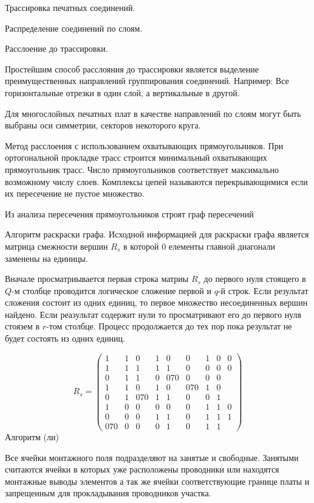 \documentclass{article}
\begin{document}
	Трассировка печатных соединений.

	Распределение соединений по слоям.

	Расслоение до трассировки.
	
	Простейшим способ расслояния до трассировки является выделение преимущественных направлений группирования соединений.
	Например: Все горизонтальные отрезки в один слой, а вертикальные в другой.

	Для многослойных печатных плат в качестве направлений по слоям могут быть выбраны оси симметрии, секторов некоторого круга.
	
	Метод расслоения с использованием охватывающих прямоугольников. При ортогональной прокладке трасс строится минимальный охватывающих прямоугольник трасс. Число прямоугольников соответствует максимально возможному числу слоев. Комплексы цепей называются перекрывающимися если их пересечение не пустое множество.

	Из анализа пересечения прямоугольников строят граф пересечений

	Алгоритм раскраски графа.
	Исходной информацией для раскраски графа является матрица смежности вершин $R_s$ в которой 0 елементы главной диагонали заменены на единицы.

	Вначале просматриывается первая строка матриы $R_s$ до первого нуля стоящего в $Q$-м столбце проводится логическое сложение первой и $q$-й строк. Если результат сложения состоит из одних единиц, то первое множество несоединенных вершин найдено. Если реазультат содержит нули то просматривают его до первого нуля стоязем в $r$-том столбце. Процесс продолжается до тех пор пока результат не будет состоять из одних единиц.

	$$
	R_s = 
	\begin{pmatrix}
		1 & 1 & 0 & 1 & 0 & 0 & 1 & 0 & 0\\
		1 & 1 & 1 & 1 & 1 & 0 & 0 & 0 & 0\\
		0 & 1 & 1 & 0 & 0 7 0 & 0 & 0 & 0\\
		1 & 1 & 0 & 1 & 0 & 0 7 0 & 1 & 0\\
		0 & 1 & 0 7 0 & 1 & 1 & 0 & 0 & 1\\
		1 & 0 & 0 & 0 & 0 & 0 & 1 & 1 & 0\\
		0 & 0 & 0 & 1 & 1 & 0 & 1 & 1 & 1\\
		0 7 0 & 0 & 0 & 0 & 1 & 0 & 1 & 1
	\end{pmatrix}
	$$
Алгоритм (ли)

Все ячейки монтажного поля подразделяют на занятые и свободные. Занятыми считаются ячейки в которых уже расположены проводники или находятся монтажные выводы элементов 
а так же ячейки соответствующие границе платы и запрещенным для прокладывания проводников участка.
\end{document}
